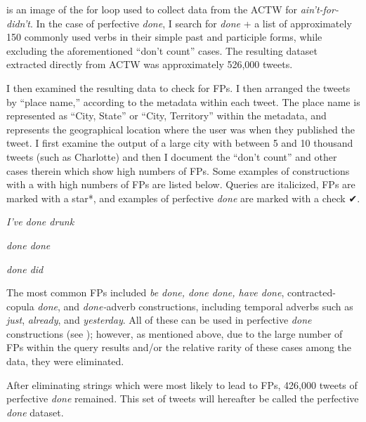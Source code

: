 \documentclass[output=paper,draftmode,colorlinks,citecolor=brown]{langscibook}
\begin{document}
 is an image of the for loop used to collect data from the ACTW for \textit{ain’t-for-didn’t}. In the case of perfective \textit{done}, I search for \textit{done} + a list of approximately 150 commonly used verbs in their simple past and participle forms, while excluding the aforementioned “don’t count” \citep{Blake1997} cases. The resulting dataset extracted directly from ACTW was approximately 526,000 tweets.

I then examined the resulting data to check for FPs. I then arranged the tweets by “place name,” according to the metadata within each tweet. The place name is represented as “City, State” or “City, Territory” within the metadata, and represents the geographical location where the user was when they published the tweet. I first examine the output of a large city with between 5 and 10 thousand tweets (such as Charlotte) and then I document the “don’t count” and other cases therein which show high numbers of FPs. Some examples of constructions with a with high numbers of FPs are listed below. Queries are italicized, FPs are marked with a star*, and examples of perfective \textit{done} are marked with a check ✔.\pagebreak

\ea \textit{I’ve done drunk} %
\z
\z

\ea  \textit{done done} %
\z
\z

\ea  \textit{done did} %
\z
\z

The most common FPs included \textit{be done, done done, have done}, contracted-copula \textit{done}, and \textit{done-}adverb constructions, including temporal adverbs such as \textit{just}, \textit{already}, and \textit{yesterday}. All of these can be used in perfective \textit{done} constructions (see ); however, as mentioned above, due to the large number of FPs within the query results and/or the relative rarity of these cases among the data, they were eliminated.

After eliminating strings which were most likely to lead to FPs, 426,000 tweets of perfective \textit{done} remained. This set of tweets will hereafter be called the perfective \textit{done} dataset.
\end{document}
